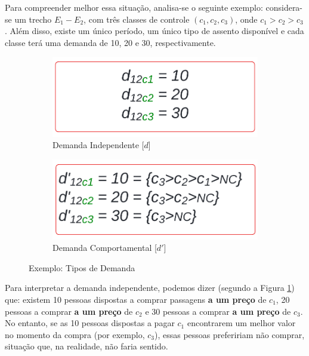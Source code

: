 Para compreender melhor essa situação, analisa-se o seguinte exemplo: considera-se um trecho $E_1-E_2$, com três classes de controle $(c_1, c_2, c_3)$, onde $c_1 > c_2 > c_3$. Além disso, existe um único período, um único tipo de assento disponível e cada classe terá uma demanda de 10, 20 e 30, respectivamente.

\begin{figure}[H]
	\centering
	\begin{subfigure}[b]{0.40\linewidth}
		\includegraphics[width=\linewidth]{img/dem_indepen.png}
		\caption{Demanda Independente [$d$]}
		\label{fig:dem_indepen}
	\end{subfigure}\hspace{5mm}
	\begin{subfigure}[b]{0.40\linewidth}
		\includegraphics[width=\linewidth]{img/dem_compo.png}
		\caption{Demanda Comportamental [$d'$]}
		\label{fig:dem_comporta}
	\end{subfigure}
	\caption{Exemplo: Tipos de Demanda}
	\label{fig: tipos_demanda}
\end{figure}


Para interpretar a demanda independente, podemos dizer (segundo a Figura \ref{fig:dem_indepen}) que: existem 10 pessoas dispostas a comprar passagens \textbf{a um preço} de $c_1$, 20 pessoas a comprar \textbf{a um preço} de $c_2$ e 30 pessoas a comprar \textbf{a um preço} de $c_3$. No entanto, se as 10 pessoas dispostas a pagar $c_1$ encontrarem um melhor valor no momento da compra (por exemplo, $c_3$), essas pessoas prefeririam não comprar, situação que, na realidade, não faria sentido.

